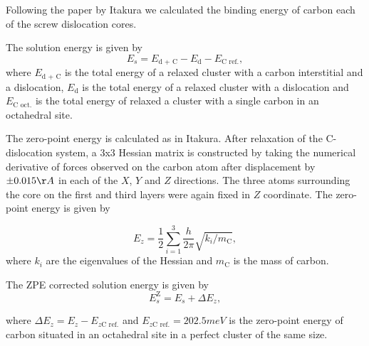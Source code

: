 \documentclass[a4paper]{article}
\begin{document}
Following the paper by Itakura
\cite{itakura13_effec_hydrog_atoms_screw_disloc} we calculated the
binding energy of carbon each of the screw dislocation cores. 

The solution energy is given by 
\[ E_s = E_{\text{d + C}} - E_{\text{d}} - E_{\text{C ref.}}, \]
where \(E_{\text{d + C}}\) is the total energy of a relaxed cluster with a
carbon interstitial and a dislocation, \(E_{\text{d}}\) is the total
energy of a relaxed cluster with a dislocation and \(E_{\text{C
    oct.}}\) is the total energy of relaxed a cluster with a single carbon in
an octahedral site.

The zero-point energy is calculated as in Itakura. After relaxation of the
C-dislocation system, a 3x3 Hessian matrix is constructed by taking the
numerical derivative of forces observed on the carbon atom after
displacement by \(\pm 0.015 \AA\) in each of the \(X\), \(Y\) and \(Z\) directions.
The three atoms surrounding the core on the first and third layers were
again fixed in \(Z\) coordinate. The zero-point energy is
given by

\[ E_z = \frac{1}{2} \sum_{i=1}^3 \frac{h}{2\pi} \sqrt{ k_i /
    m_{\text{C}} },  \]
where \(k_i\) are the eigenvalues of the Hessian and \(m_\text{C}\) is
the mass of carbon. 

The ZPE corrected solution energy is given by 
\[ E^{\text{Z}}_{s} = E_s + \Delta E_z,  \]

where \(\Delta E_z = E_z - E_{z\text{C ref.}}\) and \(E_{z\text{C ref.}} = 202.5 meV\) is the zero-point energy of carbon
situated in an octahedral site in a perfect cluster of the same size. 
\end{document}
